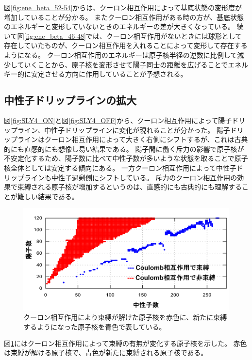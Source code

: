\documentclass[12pt]{jarticle}
\begin{document}
図\ref{fig:ene_beta_52-54}からは、クーロン相互作用によって基底状態の変形度が増加していることが分かる。
またクーロン相互作用がある時の方が、基底状態のエネルギーと変形していないときのエネルギーの差が大きくなっている。
続いて図\ref{fig:ene_beta_46-48}では、クーロン相互作用がないときには球形として存在していたものが、クーロン相互作用を入れることによって変形して存在するようになる。
クーロン相互作用のエネルギーは原子核半径の逆数に比例して減少していくことから、原子核を変形させて陽子同士の距離を広げることでエネルギー的に安定させる方向に作用していることが予想される。

\subsection{中性子ドリップラインの拡大}
図\ref{fig:SLY4_ON}と図\ref{fig:SLY4_OFF}から、クーロン相互作用によって陽子ドリップライン、中性子ドリップラインに変化が現れることが分かった。
陽子ドリップラインはクーロン相互作用によって大きく右側にシフトするが、これは古典的にも直感的にも想像し易い結果である。
陽子間に働く斥力の影響で原子核が不安定化するため、陽子数に比べて中性子数が多いような状態を取ることで原子核全体としては安定する傾向にある。
一方クーロン相互作用によって中性子ドリップラインも中性子過剰側にシフトしている。
斥力のクーロン相互作用の効果で束縛される原子核が増加するというのは、直感的にも古典的にも理解することが難しい結果である。
\begin{figure}[H]
    \centering
    \includegraphics[width=130mm]{../ドリップラインの変化.png}
    \caption{
        クーロン相互作用により束縛が解けた原子核を赤色に、新たに束縛するようになった原子核を青色で表している。
    }\label{fig:ドリップラインの変化}
\end{figure}
図\ref{fig:ドリップラインの変化}にはクーロン相互作用によって束縛の有無が変化する原子核を示した。
赤色は束縛が解ける原子核で、青色が新たに束縛される原子核である。
\end{document}
